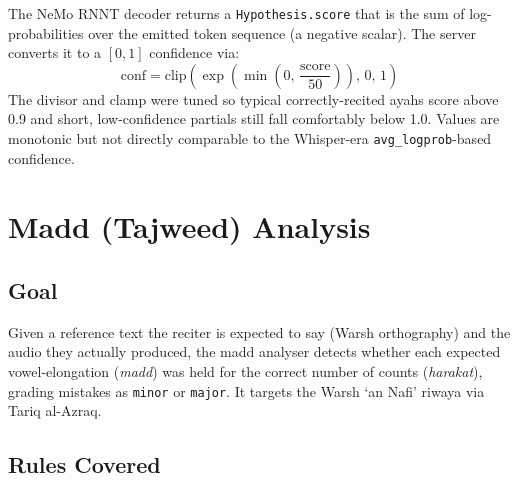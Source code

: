 \begin{infobox}[title=Confidence Calculation]
The NeMo RNNT decoder returns a \texttt{Hypothesis.score} that is the sum of log-probabilities over the emitted token sequence (a negative scalar). The server converts it to a $[0, 1]$ confidence via:
$$\mathrm{conf} = \mathrm{clip}\!\left(\exp\!\left(\min\!\left(0,\,\frac{\text{score}}{50}\right)\right),\, 0,\, 1\right)$$
The divisor and clamp were tuned so typical correctly-recited ayahs score above 0.9 and short, low-confidence partials still fall comfortably below 1.0. Values are monotonic but not directly comparable to the Whisper-era \texttt{avg\_logprob}-based confidence.
\end{infobox}

\chapter{Madd (Tajweed) Analysis}
\label{chap:madd}

\section{Goal}
Given a reference text the reciter is expected to say (Warsh orthography) and the audio they actually produced, the madd analyser detects whether each expected vowel-elongation (\emph{madd}) was held for the correct number of counts (\emph{harakat}), grading mistakes as \texttt{minor} or \texttt{major}. It targets the Warsh `an Nafi' riwaya via Tariq al-Azraq.

\section{Rules Covered}

